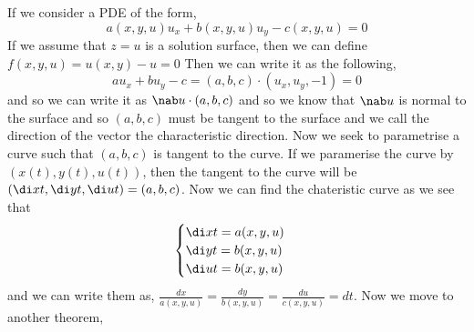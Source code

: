 \noindent
If we consider a PDE of the form,
$$ a(x, y, u)u_x + b(x, y, u)u_y - c(x, y, u) = 0 $$
If we assume that $z = u$ is a solution surface, then we can define $f(x, y, u) = u(x, y) - u = 0$
Then we can write it as the following,
$$ au_x + bu_y - c = (a, b, c) \cdot (u_x, u_y, -1) = 0 $$
and so we can write it as $\nab u \cdot (a, b, c)$ and so we know that $\nab u$ is normal to the surface and so $(a, b, c)$ must be tangent to the surface and we call the direction of the vector the characteristic direction. Now we seek to parametrise a curve such that $(a, b, c)$ is tangent to the curve. If we paramerise the curve by $(x(t), y(t), u(t))$, then the tangent to the curve will be $(\di x t, \di y t, \di u t) = (a, b, c)$. Now we can find the chateristic curve as we see that
$$ \begin{cases}
  \di x t = a(x, y, u)\\
  \di y t = b(x, y, u)\\
  \di u t = b(x, y, u)
\end{cases} $$
and we can write them as, $\frac{dx}{a(x, y, u)} = \frac{dy}{b(x, y, u)} = \frac{du}{c(x, y, u)} = dt$. Now we move to another theorem,

